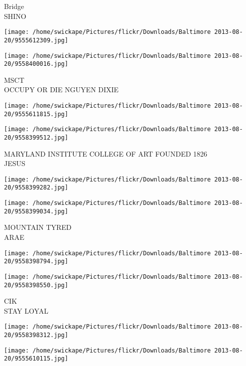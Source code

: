 \documentclass[10pt,letterpaper]{article}
\begin{document}
Bridge\\
SHINO\\
\pagebreak

\texttt{[image: /home/swickape/Pictures/flickr/Downloads/Baltimore 2013-08-20/9555612309.jpg]}

\vspace{0.25in}
\texttt{[image: /home/swickape/Pictures/flickr/Downloads/Baltimore 2013-08-20/9558400016.jpg]}

MSCT\\
OCCUPY OR DIE NGUYEN DIXIE\\
\pagebreak

\texttt{[image: /home/swickape/Pictures/flickr/Downloads/Baltimore 2013-08-20/9555611815.jpg]}

\vspace{0.25in}
\texttt{[image: /home/swickape/Pictures/flickr/Downloads/Baltimore 2013-08-20/9558399512.jpg]}

MARYLAND INSTITUTE COLLEGE OF ART FOUNDED 1826\\
JESUS\\
\pagebreak

\texttt{[image: /home/swickape/Pictures/flickr/Downloads/Baltimore 2013-08-20/9558399282.jpg]}

\vspace{0.25in}
\texttt{[image: /home/swickape/Pictures/flickr/Downloads/Baltimore 2013-08-20/9558399034.jpg]}

MOUNTAIN TYRED\\
ARAE\\
\pagebreak

\texttt{[image: /home/swickape/Pictures/flickr/Downloads/Baltimore 2013-08-20/9558398794.jpg]}

\vspace{0.25in}
\texttt{[image: /home/swickape/Pictures/flickr/Downloads/Baltimore 2013-08-20/9558398550.jpg]}

CIK\\
STAY LOYAL\\
\pagebreak

\texttt{[image: /home/swickape/Pictures/flickr/Downloads/Baltimore 2013-08-20/9558398312.jpg]}

\vspace{0.25in}
\texttt{[image: /home/swickape/Pictures/flickr/Downloads/Baltimore 2013-08-20/9555610115.jpg]}
\end{document}
